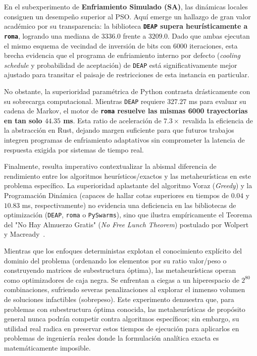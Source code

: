 \documentclass[12pt,a4paper,twoside,openright]{book}
\begin{document}
    En el subexperimento de \textbf{Enfriamiento Simulado (SA)}, las dinámicas locales consiguen un desempeño superior al PSO. Aquí emerge un hallazgo de gran valor académico por su transparencia: la biblioteca \textbf{\texttt{DEAP} supera heurísticamente a \texttt{roma}}, logrando una mediana de $3336.0$ frente a $3209.0$. Dado que ambas ejecutan el mismo esquema de vecindad de inversión de bits con 6000 iteraciones, esta brecha evidencia que el programa de enfriamiento interno por defecto (\textit{cooling schedule} y probabilidad de aceptación) de \texttt{DEAP} está significativamente mejor ajustado para transitar el paisaje de restricciones de esta instancia en particular.

    No obstante, la superioridad paramétrica de Python contrasta drásticamente con su sobrecarga computacional. Mientras \texttt{DEAP} requiere $327.27$ ms para evaluar su cadena de Markov, el motor de \textbf{\texttt{roma} resuelve las mismas 6000 trayectorias en tan solo $44.35$ ms}. Esta ratio de aceleración de $\mathbf{7.3\times}$ revalida la eficiencia de la abstracción en Rust, dejando margen suficiente para que futuros trabajos integren programas de enfriamiento adaptativos sin comprometer la latencia de respuesta exigida por sistemas de tiempo real.

    Finalmente, resulta imperativo contextualizar la abismal diferencia de rendimiento entre los algoritmos heurísticos/exactos y las metaheurísticas en este problema específico. La superioridad aplastante del algoritmo Voraz (\textit{Greedy}) y la Programación Dinámica (capaces de hallar cotas superiores en tiempos de $0.04$ y $10.83$ ms, respectivamente) no evidencia una deficiencia en las bibliotecas de optimización (\texttt{DEAP}, \texttt{roma} o \texttt{PySwarms}), sino que ilustra empíricamente el Teorema del "No Hay Almuerzo Gratis" (\textit{No Free Lunch Theorem}) postulado por Wolpert y Macready~\cite{wolpert1997no}.

    Mientras que los enfoques deterministas explotan el conocimiento explícito del dominio del problema (ordenando los elementos por su ratio valor/peso o construyendo matrices de subestructura óptima), las metaheurísticas operan como optimizadores de caja negra. Se enfrentan a ciegas a un hiperespacio de $2^{80}$ combinaciones, sufriendo severas penalizaciones al explorar el inmenso volumen de soluciones infactibles (sobrepeso). Este experimento demuestra que, para problemas con subestructura óptima conocida, las metaheurísticas de propósito general nunca podrán competir contra algoritmos específicos; sin embargo, su utilidad real radica en preservar estos tiempos de ejecución para aplicarlos en problemas de ingeniería reales donde la formulación analítica exacta es matemáticamente imposible.
\end{document}
